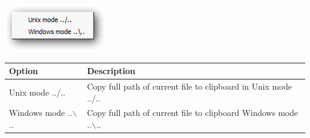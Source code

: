 \includegraphics[scale=0.50]{./res/menu_file_copyfullpathtoclipboard.png}\\

\begin{scriptsize}\begin{tabularx}{\textwidth}{>{\hsize=0.3\hsize}X>{\hsize=0.8\hsize}X}\\
    \hline
    \textbf{Option} & \textbf{Description} \\
    \hline
    Unix mode ../.. & Copy full path of current file to clipboard in Unix mode ../.. \\
    Windows mode ..$\backslash$.. & Copy full path of current file to clipboard Windows mode ..$\backslash$.. \\
    \hline
  \end{tabularx}\end{scriptsize}
